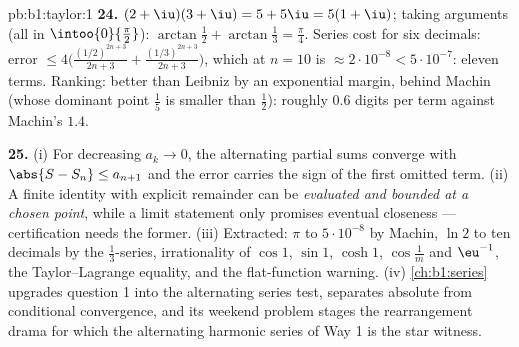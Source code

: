 \begin{solution}{pb:b1:taylor:1}
\textbf{24.} $(2+\iu)(3+\iu) = 5 + 5\iu = 5(1+\iu)$; taking
arguments (all in $\intoo{0}{\frac\pi2}$): $\arctan\frac12 +
\arctan\frac13 = \frac\pi4$. Series cost for six decimals:
error $\leq 4\bigl(\frac{(1/2)^{2n+3}}{2n+3} +
\frac{(1/3)^{2n+3}}{2n+3}\bigr)$, which at $n = 10$ is
$\approx 2\cdot10^{-8} < 5\cdot10^{-7}$: eleven terms. Ranking:
better than Leibniz by an exponential margin, behind Machin
(whose dominant point $\frac15$ is smaller than $\frac12$):
roughly $0.6$ digits per term against Machin's $1.4$.

\textbf{25.} (i) For decreasing $a_k \to 0$, the alternating
partial sums converge with $\abs{S - S_n} \leq a_{n+1}$ and the
error carries the sign of the first omitted term. (ii) A finite
identity with explicit remainder can be \emph{evaluated and
bounded at a chosen point}, while a limit statement only
promises eventual closeness --- certification needs the former.
(iii) Extracted: $\pi$ to $5\cdot10^{-8}$ by Machin, $\ln 2$ to
ten decimals by the $\frac13$-series, irrationality of $\cos 1$,
$\sin 1$, $\cosh 1$, $\cos\frac1m$ and $\eu^{-1}$, the
Taylor--Lagrange equality, and the flat-function warning. (iv)
\cref{ch:b1:series} upgrades question 1 into the alternating
series test, separates absolute from conditional convergence,
and its weekend problem stages the rearrangement drama for
which the alternating harmonic series of Way 1 is the star
witness.
\end{solution}
